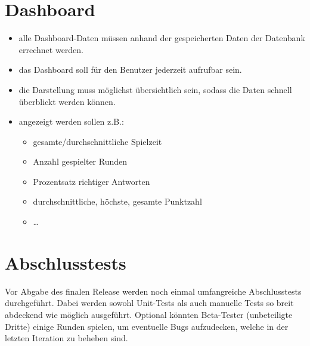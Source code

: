 \documentclass[11pt,a4paper]{scrreprt}
\begin{document}
\section{Dashboard}
\begin{itemize}
\item alle Dashboard-Daten müssen anhand der gespeicherten Daten der Datenbank errechnet werden.
\item das Dashboard soll für den Benutzer jederzeit aufrufbar sein.
\item die Darstellung muss möglichst übersichtlich sein, sodass die Daten schnell überblickt werden können.
\item angezeigt werden sollen z.B.:
\begin{itemize}
\item gesamte/durchschnittliche Spielzeit
\item Anzahl gespielter Runden
\item Prozentsatz richtiger Antworten
\item durchschnittliche, höchste, gesamte Punktzahl
\item \dots
\end{itemize}
\end{itemize}

\section{Abschlusstests}
Vor Abgabe des finalen Release werden noch einmal umfangreiche Abschlusstests durchgeführt. Dabei werden sowohl Unit-Tests als auch manuelle Tests so breit abdeckend wie möglich ausgeführt. Optional könnten Beta-Tester (unbeteiligte Dritte) einige Runden spielen, um eventuelle Bugs aufzudecken, welche in der letzten Iteration zu beheben sind.
\end{document}
